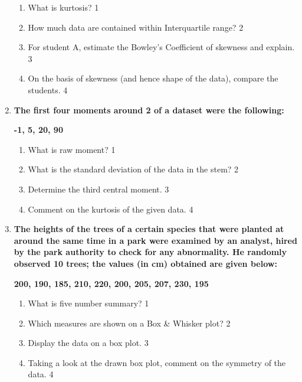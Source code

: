 \documentclass[a4paper,oneside]{book}
\begin{document}
\begin{enumerate}
  \begin{enumerate}
    \item
	What is kurtosis? \hfill 1
    \item
	How much data are contained within Interquartile range? \hfill 2
    \item  
	For student A, estimate the Bowley's Coefficient of skewness and explain. \hfill 3
    \item
	On the basis of skewness (and hence shape of the data), compare the students. \hfill 4
  \end{enumerate}
  
   \item
	  \textbf{The first four moments around 2 of a dataset were the following:}
	  
	  \begin{center}
	  \textbf{-1, 5, 20, 90}
	  \end{center}
  
  \begin{enumerate}
    \item
	What is raw moment? \hfill 1
    \item
	What is the standard deviation of the data in the stem? \hfill 2
    \item  
	Determine the third central moment. \hfill 3
    \item
	Comment on the kurtosis of the given data. \hfill 4
  \end{enumerate}
  
     \item
	  \textbf{The heights of the trees of a certain species that were planted at around the same time in a park were examined by an analyst, hired by the park authority to check for any abnormality. He randomly observed 10 trees; the values (in cm) obtained are given below:} 
	  
	  	  \begin{center}
	  \textbf{200, 190, 185, 210, 220, 200, 205, 207, 230, 195}
	  \end{center}
  
  \begin{enumerate}
    \item
	What is five number summary? \hfill 1
    \item
	Which measures are shown on a Box \& Whisker plot? \hfill 2
    \item  
	Display the data on a box plot. \hfill 3
    \item
	Taking a look at the drawn box plot, comment on the symmetry of the data. \hfill 4
  \end{enumerate}


\end{enumerate}
\end{document}
